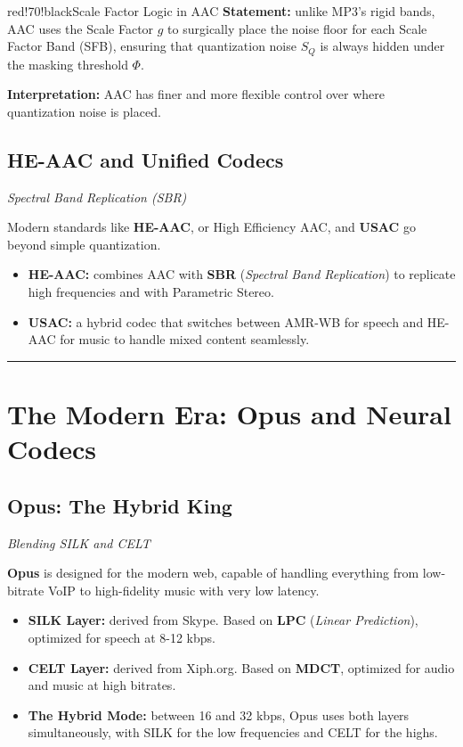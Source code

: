 \begin{calloutbox}{red!70!black}{Scale Factor Logic in AAC}
\textbf{Statement:} unlike MP3's rigid bands, AAC uses the Scale Factor $g$ to surgically place the noise floor for each Scale Factor Band (SFB), ensuring that quantization noise $S_Q$ is always hidden under the masking threshold $\Phi$.

\textbf{Interpretation:} AAC has finer and more flexible control over where quantization noise is placed.
\end{calloutbox}

\subsection{HE-AAC and Unified Codecs}

\textit{Spectral Band Replication (SBR)}

Modern standards like \textbf{HE-AAC}, or High Efficiency AAC, and \textbf{USAC} go beyond simple quantization.

\begin{itemize}
\item \textbf{HE-AAC:} combines AAC with \textbf{SBR} (\textit{Spectral Band Replication}) to replicate high frequencies and with Parametric Stereo.
\item \textbf{USAC:} a hybrid codec that switches between AMR-WB for speech and HE-AAC for music to handle mixed content seamlessly.
\end{itemize}

\bigskip\hrule\bigskip
\section{The Modern Era: Opus and Neural Codecs}

\subsection{Opus: The Hybrid King}

\textit{Blending SILK and CELT}

\textbf{Opus} is designed for the modern web, capable of handling everything from low-bitrate VoIP to high-fidelity music with very low latency.

\begin{itemize}
\item \textbf{SILK Layer:} derived from Skype. Based on \textbf{LPC} (\textit{Linear Prediction}), optimized for speech at 8-12 kbps.
\item \textbf{CELT Layer:} derived from Xiph.org. Based on \textbf{MDCT}, optimized for audio and music at high bitrates.
\item \textbf{The Hybrid Mode:} between 16 and 32 kbps, Opus uses both layers simultaneously, with SILK for the low frequencies and CELT for the highs.
\end{itemize}


